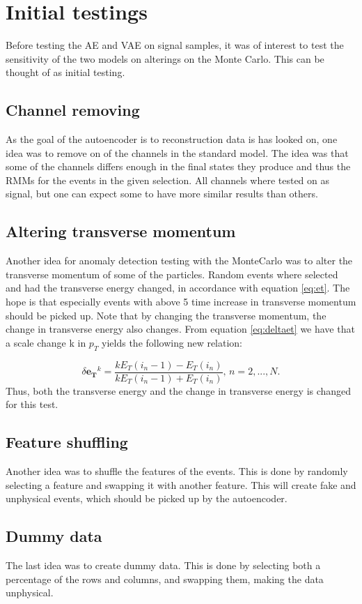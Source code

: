 \section*{Initial testings}
Before testing the AE and VAE on signal samples, it was of interest to test the sensitivity of the
two models on alterings on the Monte Carlo. This can be thought of as initial testing. 
\subsection*{Channel removing}
As the goal of the autoencoder is to reconstruction data is has looked on, one idea was to remove on of the channels in the standard model.
The idea was that some of the channels differs enough in the final states they produce and thus the RMMs for the events in the given selection. 
All channels where tested on as signal, but one can expect some to have more similar results than others. 

\subsection*{Altering transverse momentum}
Another idea for anomaly detection testing with the MonteCarlo was to alter the transverse momentum of some of the particles. Random events where
selected and had the transverse energy changed, in accordance with equation \ref{eq:et}. The hope is that especially events with above 5 time 
increase in transverse momentum should be picked up. Note that by changing the transverse momentum, the change in transverse energy also changes. 
From equation \ref{eq:deltaet} we have that a scale change k in $p_T$ yields the following new relation:

\begin{equation}\label{eq:deltaet_scale}
    \delta\boldsymbol{e_T}^k = \frac{kE_T(i_n-1) - E_T(i_n)}{kE_T(i_n-1) + E_T(i_n)}, \, n = 2, ..., N.
\end{equation}
Thus, both the transverse energy and the change in transverse energy is changed for this test.

\subsection*{Feature shuffling}
Another idea was to shuffle the features of the events. This is done by randomly selecting a feature and swapping it with another feature. 
This will create fake and unphysical events, which should be picked up by the autoencoder. 
\subsection*{Dummy data}
The last idea was to create dummy data. This is done by selecting both a percentage of the rows and columns, and swapping them, 
making the data unphysical. 